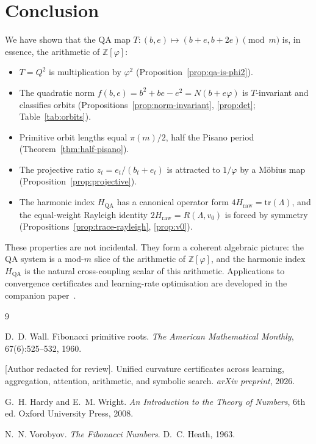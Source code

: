 \documentclass[11pt]{article}
\theoremstyle{definition}
\theoremstyle{remark}
\newcommand{\Zfi}{\mathbb{Z}[\varphi]}
\newcommand{\hqa}{H_{\mathrm{QA}}}
\newcommand{\hraw}{H_{\mathrm{raw}}}
\begin{document}
\section{Conclusion}
\label{sec:conclusion}

We have shown that the QA map $T:(b,e)\mapsto(b+e,b+2e)\pmod{m}$ is, in essence,
the arithmetic of $\Zfi$:

\begin{itemize}
  \item $T=Q^2$ is multiplication by $\varphi^2$ (Proposition~\ref{prop:qa-is-phi2}).
  \item The quadratic norm $f(b,e)=b^2+be-e^2=N(b+e\varphi)$ is $T$-invariant and
    classifies orbits (Propositions~\ref{prop:norm-invariant}, \ref{prop:det};
    Table~\ref{tab:orbits}).
  \item Primitive orbit lengths equal $\pi(m)/2$, half the Pisano period
    (Theorem~\ref{thm:half-pisano}).
  \item The projective ratio $z_t=e_t/(b_t+e_t)$ is attracted to $1/\varphi$ by a
    M\"{o}bius map (Proposition~\ref{prop:projective}).
  \item The harmonic index $\hqa$ has a canonical operator form
    $4\hraw=\mathrm{tr}(\Lambda)$, and the equal-weight Rayleigh identity
    $2\hraw=R(\Lambda,v_0)$ is forced by symmetry
    (Propositions~\ref{prop:trace-rayleigh}, \ref{prop:v0}).
\end{itemize}

These properties are not incidental.  They form a coherent algebraic picture:
the QA system is a mod-$m$ slice of the arithmetic of $\Zfi$, and the harmonic
index $\hqa$ is the natural cross-coupling scalar of this arithmetic.
Applications to convergence certificates and learning-rate optimisation are
developed in the companion paper~\cite{companion}.


\begin{thebibliography}{9}

D.~D. Wall.
\newblock Fibonacci primitive roots.
\newblock \textit{The American Mathematical Monthly}, 67(6):525--532, 1960.

[Author redacted for review].
\newblock Unified curvature certificates across learning, aggregation,
  attention, arithmetic, and symbolic search.
\newblock \textit{arXiv preprint}, 2026.

G.~H. Hardy and E.~M. Wright.
\newblock \textit{An Introduction to the Theory of Numbers}, 6th ed.
\newblock Oxford University Press, 2008.

N.~N. Vorobyov.
\newblock \textit{The Fibonacci Numbers}.
\newblock D.~C. Heath, 1963.

\end{thebibliography}
\end{document}
